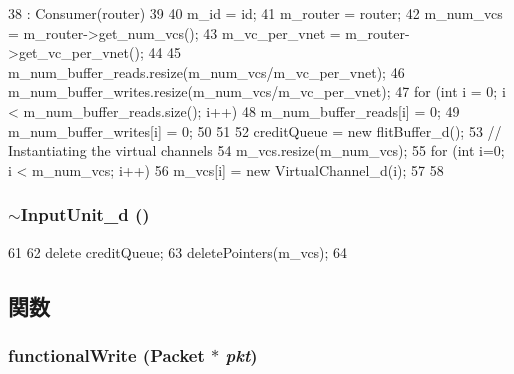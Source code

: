 \begin{DoxyCode}
38                                                  : Consumer(router)
39 {
40     m_id = id;
41     m_router = router;
42     m_num_vcs = m_router->get_num_vcs();
43     m_vc_per_vnet = m_router->get_vc_per_vnet();
44 
45     m_num_buffer_reads.resize(m_num_vcs/m_vc_per_vnet);
46     m_num_buffer_writes.resize(m_num_vcs/m_vc_per_vnet);
47     for (int i = 0; i < m_num_buffer_reads.size(); i++) {
48         m_num_buffer_reads[i] = 0;
49         m_num_buffer_writes[i] = 0;
50     }
51 
52     creditQueue = new flitBuffer_d();
53     // Instantiating the virtual channels
54     m_vcs.resize(m_num_vcs);
55     for (int i=0; i < m_num_vcs; i++) {
56         m_vcs[i] = new VirtualChannel_d(i);
57     }
58 }
\end{DoxyCode}
\hypertarget{classInputUnit__d_a4614c64584d1e7dae55da95452b0ea2a}{
\subsubsection[{$\sim$InputUnit\_\-d}]{\setlength{\rightskip}{0pt plus 5cm}$\sim${\bf InputUnit\_\-d} ()}}
\label{classInputUnit__d_a4614c64584d1e7dae55da95452b0ea2a}



\begin{DoxyCode}
61 {
62     delete creditQueue;
63     deletePointers(m_vcs);
64 }
\end{DoxyCode}


\subsection{関数}
\hypertarget{classInputUnit__d_ad07b9def1d6f5e5f988a254c3a9d1ad9}{
\subsubsection[{functionalWrite}]{ functionalWrite ({\bf Packet} $\ast$ {\em pkt})}}
\label{classInputUnit__d_ad07b9def1d6f5e5f988a254c3a9d1ad9}



